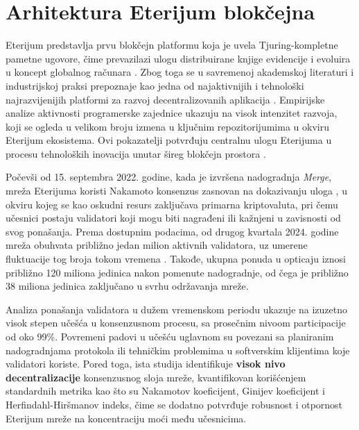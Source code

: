\chapter{Arhitektura Eterijum blokčejna}
Eterijum \cite{wood2014ethereum, ethdocs}  predstavlja prvu blokčejn platformu koja je uvela Tjuring-kompletne pametne ugovore, čime prevazilazi ulogu distribuirane knjige evidencije i evoluira u koncept globalnog računara . Zbog toga se u savremenoj akademskoj literaturi i industrijskoj praksi prepoznaje kao jedna od najaktivnijih i tehnološki najrazvijenijih platformi za razvoj decentralizovanih aplikacija \cite{hashkey2024}. Empirijske analize aktivnosti programerske zajednice ukazuju na visok intenzitet razvoja, koji se ogleda u velikom broju izmena  u ključnim repozitorijumima u okviru Eterijum ekosistema. Ovi pokazatelji potvrđuju centralnu ulogu Eterijuma u procesu tehnoloških inovacija unutar šireg blokčejn prostora \cite{vaccargiu2025mining}.

Počevši od 15. septembra 2022. godine, kada je izvršena nadogradnja \textit{Merge}, mreža Eterijuma koristi Nakamoto konsenzus zasnovan na dokazivanju uloga , u okviru kojeg se kao oskudni resurs zaključava primarna kriptovaluta, pri čemu učesnici postaju validatori koji mogu biti nagrađeni ili kažnjeni u zavisnosti od svog ponašanja. Prema dostupnim podacima, od drugog kvartala 2024. godine mreža obuhvata približno jedan milion aktivnih validatora, uz umerene fluktuacije tog broja tokom vremena \cite{ethereumvalidators}. Takođe, ukupna ponuda u opticaju iznosi približno 120 miliona jedinica nakon pomenute nadogradnje, od čega je približno 38 miliona jedinica zaključano u svrhu održavanja mreže.

Analiza ponašanja validatora u dužem vremenskom periodu \cite{grandjean2024ethereum} ukazuje na izuzetno visok stepen učešća u konsenzusnom procesu, sa prosečnim nivoom participacije od oko 99\%. Povremeni padovi u učešću uglavnom su povezani sa planiranim nadogradnjama protokola ili tehničkim problemima u softverskim klijentima koje validatori koriste. Pored toga, ista studija identifikuje \textbf{visok nivo decentralizacije} konsenzusnog sloja mreže, kvantifikovan korišćenjem standardnih metrika kao što su Nakamotov koeficijent, Ginijev koeficijent i Herfindahl-Hiršmanov indeks, čime se dodatno potvrđuje robusnost i otpornost Eterijum mreže na koncentraciju moći među učesnicima.

